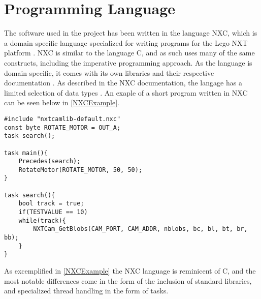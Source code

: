 \section{Programming Language}
The software used in the \name project has been written in the language NXC,
which is a domain specific language specialized for writing programs for the
Lego NXT platform \cite{NXCIntro}. NXC is similar to the language C, and as such
uses many of the same constructs, including the imperative programming approach. As the
language is domain specific, it comes with its own libraries and their
respective documentation \cite{NXCIntro}. As described in the NXC documentation,
the langage has a limited selection of data types \cite{NXCVariables}. An exaple
of a short program written in NXC can be seen below in \autoref{NXCExample}.\nl

\begin{minipage}[H]{\linewidth}
\begin{lstlisting}[caption = Exaple of a program written in the NXC language, label = NXCExample] 
#include "nxtcamlib-default.nxc"
const byte ROTATE_MOTOR = OUT_A;
task search();

task main(){
    Precedes(search);
    RotateMotor(ROTATE_MOTOR, 50, 50);
}

task search(){
	bool track = true;
	if(TESTVALUE == 10)
	while(track){
        NXTCam_GetBlobs(CAM_PORT, CAM_ADDR, nblobs, bc, bl, bt, br, bb);
	}
}
\end{lstlisting}
\end{minipage}

As excemplified in \autoref{NXCExample} the NXC language is reminicent of C, and
the most notable differences come in the form of the inclusion of standard
libraries, and specialized thread handling in the form of tasks.

